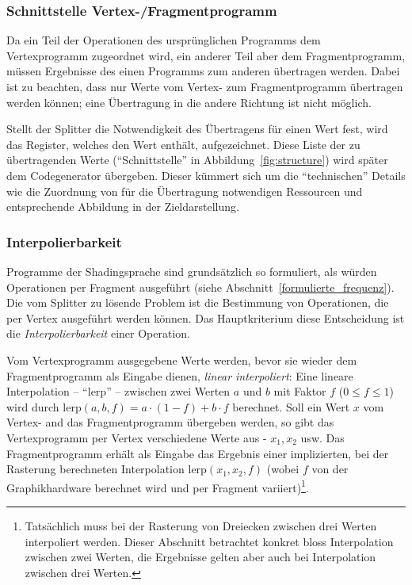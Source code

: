 \documentclass[twoside,a4paper,fleqn,12pt]{article}
\begin{document}

\subsubsection{Schnittstelle Vertex-/Fragmentprogramm}
\label{schnittstelle}

Da ein Teil der Operationen des ursprünglichen Programms dem Vertexprogramm zugeordnet wird, ein anderer Teil aber dem
Fragmentprogramm, müssen Ergebnisse des einen Programms zum anderen übertragen werden.
Dabei ist zu beachten, dass nur Werte vom Vertex- zum Fragmentprogramm übertragen werden können; %
eine Übertragung in die andere Richtung ist nicht möglich.

Stellt der Splitter die Notwendigkeit des Übertragens für einen Wert fest, wird das Register, welches den Wert enthält, aufgezeichnet.
Diese Liste der zu übertragenden Werte ("`Schnittstelle"' in Abbildung~\ref{fig:structure}) wird später dem Codegenerator übergeben.
Dieser kümmert sich um die "`technischen"' Details wie die Zuordnung von für die Übertragung notwendigen Ressourcen und %
entsprechende Abbildung in der Zieldarstellung.

\subsubsection{Interpolierbarkeit}
\label{Interpolierbarkeit}

Programme der Shadingsprache sind grundsätzlich so formuliert, als würden Operationen per Fragment ausgeführt (siehe Abschnitt~\ref{formulierte_frequenz}).
Die vom Splitter zu lösende Problem ist die Bestimmung von Operationen, die per Vertex ausgeführt werden können.
Das Hauptkriterium diese Entscheidung ist die \emph{Interpolierbarkeit} einer Operation.

\newcommand\lerp{\mathrm{lerp}}
Vom Vertexprogramm ausgegebene Werte werden, bevor sie wieder dem Fragmentprogramm als Eingabe dienen, \emph{linear interpoliert}: %
Eine lineare Interpolation -- "`$\lerp$"' -- zwischen zwei Werten $a$ und $b$ mit Faktor $f$ ($0 \le f \le 1$) wird durch $\lerp(a, b, f) = a \cdot (1-f) + b \cdot f$ berechnet.
Soll ein Wert $x$ vom Vertex- and das Fragmentprogramm übergeben werden, so gibt das Vertexprogramm per Vertex verschiedene Werte aus - $x_1, x_2$ usw.
Das Fragmentprogramm erhält als Eingabe das Ergebnis einer implizierten, bei der Rasterung berechneten Interpolation $\lerp(x_1, x_2, f)$ (wobei $f$ von der Graphikhardware berechnet wird
und per Fragment variiert)\footnote{Tatsächlich muss bei der Rasterung von Dreiecken zwischen drei Werten interpoliert werden. Dieser Abschnitt betrachtet konkret
bloss Interpolation zwischen zwei Werten, die Ergebnisse gelten aber auch bei Interpolation zwischen drei Werten.}.
\end{document}
